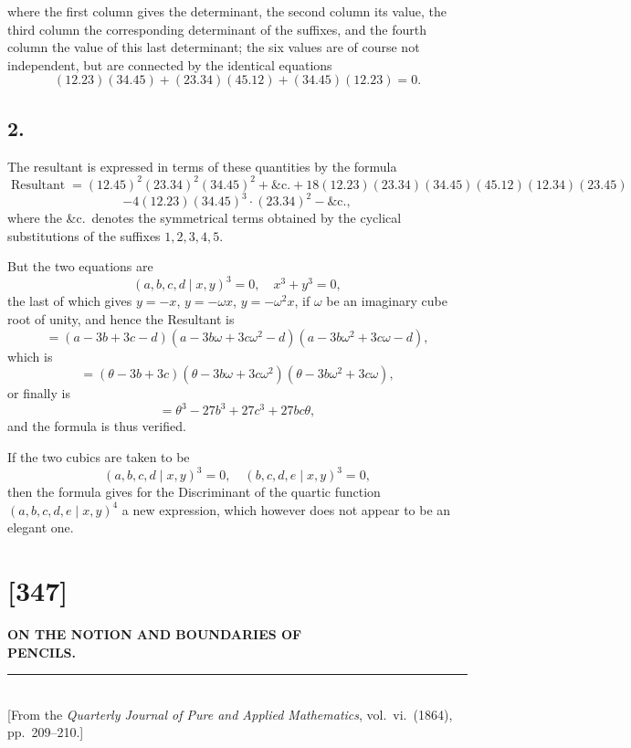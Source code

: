 \documentclass[11pt,a4paper]{article}
\theoremstyle{definition}
\DeclareMathOperator{\Resultant}{Resultant}
\begin{document}
\noindent
where the first column gives the determinant, the second column its value, the third
column the corresponding determinant of the suffixes, and the fourth column the value
of this last determinant; the six values are of course not independent, but are connected
by the identical equations
\[
(12.23)(34.45) + (23.34)(45.12) + (34.45)(12.23) = 0.
\]

\subsection*{2.}

The resultant is expressed in terms of these quantities by the formula
\[
\Resultant = (12.45)^{2}(23.34)^{2}(34.45)^{2} + \&\text{c.} + 18(12.23)(23.34)(34.45)(45.12)(12.34)(23.45)
\]
\[
- 4(12.23)(34.45)^{3}\cdot(23.34)^{2} - \&\text{c.},
\]
where the \&c.\ denotes the symmetrical terms obtained by the cyclical substitutions of
the suffixes $1, 2, 3, 4, 5$.

But the two equations are
\[
(a, b, c, d \mid x, y)^{3} = 0,\quad x^{3} + y^{3} = 0,
\]
the last of which gives $y = -x$, $y = -\omega x$, $y = -\omega^{2} x$, if $\omega$ be an imaginary cube root of
unity, and hence the Resultant is
\[
= (a - 3b + 3c - d)(a - 3b\omega + 3c\omega^{2} - d)(a - 3b\omega^{2} + 3c\omega - d),
\]
which is
\[
= (\theta - 3b + 3c)(\theta - 3b\omega + 3c\omega^{2})(\theta - 3b\omega^{2} + 3c\omega),
\]
or finally is
\[
= \theta^{3} - 27b^{3} + 27c^{3} + 27bc\theta,
\]
and the formula is thus verified.

If the two cubics are taken to be
\[
(a, b, c, d \mid x, y)^{3} = 0,\quad (b, c, d, e \mid x, y)^{3} = 0,
\]
then the formula gives for the Discriminant of the quartic function $(a, b, c, d, e \mid x, y)^{4}$
a new expression, which however does not appear to be an elegant one.

\newpage
\section*{[347]}

\begin{center}
{\large\bfseries ON THE NOTION AND BOUNDARIES OF}\\[4pt]
{\large\bfseries PENCILS.}\\[8pt]
\rule{0.5\textwidth}{0.4pt}\\[6pt]
{\small [From the \textit{Quarterly Journal of Pure and Applied Mathematics}, vol.~vi.\ (1864),}\\
{\small pp.~209--210.]}
\end{center}
\end{document}
